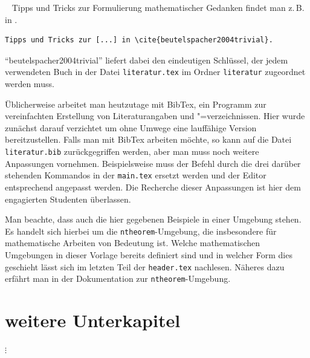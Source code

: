 \begin{beispiel}~
Tipps und Tricks zur Formulierung mathematischer Gedanken findet man z.\,B. in \cite{beutelspacher2004trivial}.
    \begin{lstlisting}
Tipps und Tricks zur [...] in \cite{beutelspacher2004trivial}.
    \end{lstlisting}
    "`beutelspacher2004trivial"' liefert dabei den eindeutigen Schlüssel, der jedem verwendeten Buch in der Datei \texttt{literatur.tex} im Ordner \texttt{literatur} zugeordnet werden muss.

    Üblicherweise arbeitet man heutzutage mit BibTex, ein Programm zur vereinfachten Erstellung von Literaturangaben und "=verzeichnissen. Hier wurde zunächst darauf verzichtet um ohne Umwege eine lauffähige Version bereitzustellen. Falls man mit BibTex arbeiten möchte, so kann auf die Datei \texttt{literatur.bib} zurückgegriffen werden, aber man muss noch weitere Anpassungen vornehmen. Beispielsweise muss der Befehl \lstinline|| durch die drei darüber stehenden Kommandos in der \texttt{main.tex} ersetzt werden und der Editor entsprechend angepasst werden. Die Recherche dieser Anpassungen ist hier dem engagierten Studenten überlassen.
\end{beispiel}

Man beachte, dass auch die hier gegebenen Beispiele in einer Umgebung stehen. Es handelt sich hierbei um die \texttt{ntheorem}-Umgebung, die insbesondere für mathematische Arbeiten von Bedeutung ist. Welche mathematischen Umgebungen in dieser Vorlage bereits definiert sind und in welcher Form dies geschieht lässt sich im letzten Teil der \texttt{header.tex} nachlesen. Näheres dazu erfährt man in der Dokumentation zur \texttt{ntheorem}-Umgebung.


\section{weitere Unterkapitel}

$\vdots$ 